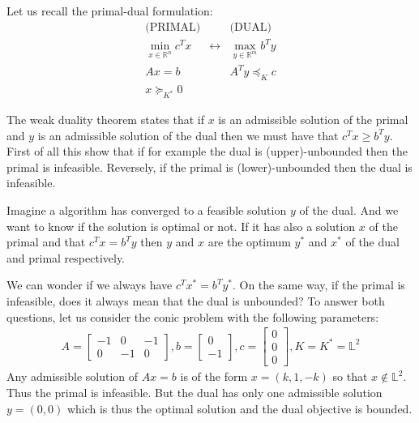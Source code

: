 Let us recall the primal-dual formulation:
\begin{eqnarray*}
    \text{(PRIMAL)} & & \text{(DUAL)} \\
    \min_{x\in \mathbb{R}^n} c^T x & \longleftrightarrow & \max_{y\in\mathbb{R}^m} b^Ty \\
    Ax = b & & A^Ty \preceq_K c\\
		x \succeq_{K^*} 0 & & 
\end{eqnarray*}

The weak duality theorem states that if $x$ is an admissible solution of the primal and $y$ is an admissible solution of the dual then we must have that $c^Tx\geq b^Ty$. First of all this show that if for example the dual is (upper)-unbounded then the primal is infeasible. Reversely, if the primal is (lower)-unbounded then the dual is infeasible.

Imagine a algorithm has converged to a feasible solution $y$ of the dual. And we want to know if the solution is optimal or not. If it has also a solution $x$ of the primal and that $c^Tx=b^Ty$ then $y$ and $x$ are the optimum $y^*$ and $x^*$ of the dual and primal respectively.

We can wonder if we always have $c^Tx^* = b^Ty^*$. On the same way, if the primal is infeasible, does it always mean that the dual is unbounded? To answer both questions, let us consider the conic problem with the following parameters:
\begin{eqnarray*}
 A = \left[\begin{array}{ccc} -1 & 0 & -1 \\ 0 & -1 & 0 \end{array}\right] ,
b = \left[\begin{array}{c} 0 \\ -1 \end{array}\right] ,
c = \left[\begin{array}{c} 0 \\ 0 \\ 0 \end{array}\right] ,
K = K^* = \mathbb{L}^2
\end{eqnarray*}
Any admissible solution of $Ax=b$ is of the form $x=(k,1,-k)$ so that $x\notin \mathbb{L}^2$. Thus the primal is infeasible. But the dual has only one admissible solution $y=(0,0)$ which is thus the optimal solution and the dual objective is bounded.


